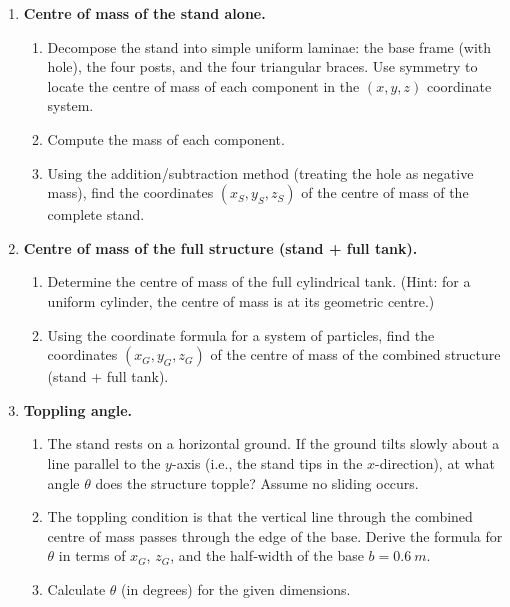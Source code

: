 \documentclass[11pt]{article}
\begin{document}
\begin{enumerate}
    \item \textbf{Centre of mass of the stand alone.}
    \begin{enumerate}
        \item Decompose the stand into simple uniform laminae: the base frame (with hole), the four posts, and the four triangular braces. Use symmetry to locate the centre of mass of each component in the $(x,y,z)$ coordinate system.
        \item Compute the mass of each component.
        \item Using the addition/subtraction method (treating the hole as negative mass), find the coordinates $(x_S, y_S, z_S)$ of the centre of mass of the complete stand.
    \end{enumerate}

    \item \textbf{Centre of mass of the full structure (stand + full tank).}
    \begin{enumerate}
        \item Determine the centre of mass of the full cylindrical tank. (Hint: for a uniform cylinder, the centre of mass is at its geometric centre.)
        \item Using the coordinate formula for a system of particles, find the coordinates $(x_G, y_G, z_G)$ of the centre of mass of the combined structure (stand + full tank).
    \end{enumerate}

    \item \textbf{Toppling angle.}
    \begin{enumerate}
        \item The stand rests on a horizontal ground. If the ground tilts slowly about a line parallel to the $y$-axis (i.e., the stand tips in the $x$-direction), at what angle $\theta$ does the structure topple? Assume no sliding occurs.
        \item The toppling condition is that the vertical line through the combined centre of mass passes through the edge of the base. Derive the formula for $\theta$ in terms of $x_G$, $z_G$, and the half‑width of the base $b = \SI{0.6}{m}$.
        \item Calculate $\theta$ (in degrees) for the given dimensions.
    \end{enumerate}


\end{enumerate}
\end{document}
